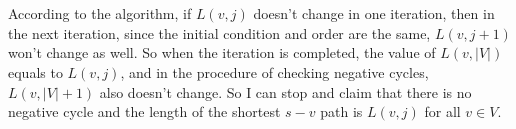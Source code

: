 \documentclass{article}
\begin{document}
\section{}

\begin{multicols}{2}

\end{multicols}

\section{}
According to the algorithm, if $L(v, j)$ doesn't change in one iteration, then in the next iteration, since the initial condition and order are the same, $L(v, j+1)$ won't change as well. So when the iteration is completed, the value of $L(v, |V|)$ equals to $L(v, j)$, and in the procedure of checking negative cycles, $L(v, |V|+1)$ also doesn't change. So I can stop and claim that there is no negative cycle and the length of the shortest $s-v$ path is $L(v, j)$ for all $v \in V $.

\section{}
\end{document}
